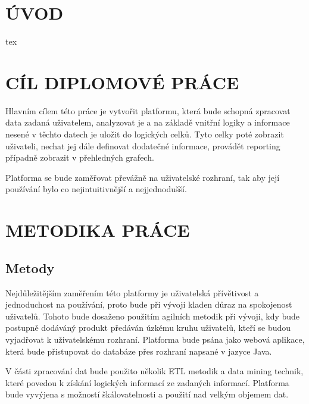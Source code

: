 \chapter*{ÚVOD}
\par tex

\chapter*{CÍL DIPLOMOVÉ PRÁCE}
Hlavním cílem této práce je vytvořit platformu, která bude schopná zpracovat data zadaná uživatelem, analyzovat je a na základě vnitřní logiky a informace nesené v těchto datech je uložit do logických celků. Tyto celky poté zobrazit uživateli, nechat jej dále definovat dodatečné informace, provádět reporting případně zobrazit v přehledných grafech.

Platforma se bude zaměřovat převážně na uživatelské rozhraní, tak aby její používání bylo co nejintuitivnější a nejjednodušší.

\chapter*{METODIKA PRÁCE}
\section*{Metody}
\par Nejdůležitějším zaměřením této platformy je uživatelská přívětivost a jednoduchost na používání, proto bude při vývoji kladen důraz na spokojenost uživatelů. Tohoto bude dosaženo použitím agilních metodik při vývoji, kdy bude postupně dodáváný produkt předáván úzkému kruhu uživatelů, kteří se budou vyjadřovat k uživatelskému rozhraní. Platforma bude psána jako webová aplikace, která bude přistupovat do databáze přes rozhraní napsané v jazyce Java.
\par V části zpracování dat bude použito několik ETL metodik a data mining technik, které povedou k získání logických informací ze zadaných informací. Platforma bude vyvýjena s možností 
škálovatelnosti a použití nad velkým objemem dat.


